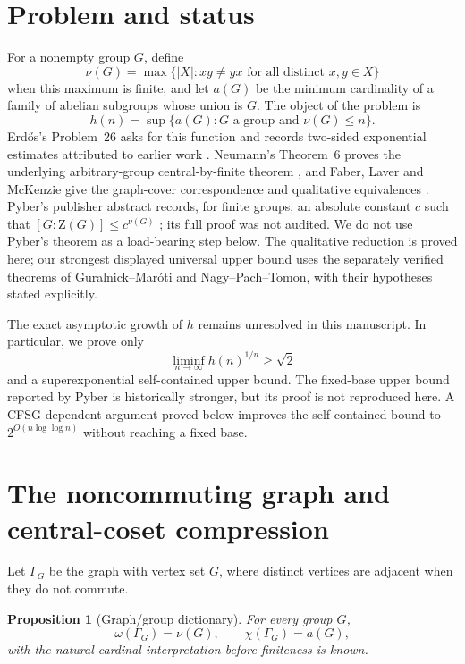 \documentclass[11pt]{article}
\newtheorem{proposition}[theorem]{Proposition}
\theoremstyle{remark}
\newcommand{\nuG}{\nu}
\newcommand{\aG}{a}
\newcommand{\Z}{\mathrm Z}
\begin{document}
\section{Problem and status}

For a nonempty group $G$, define
\[
 \nuG(G)=\max\{|X|:xy\ne yx\text{ for all distinct }x,y\in X\}
\]
when this maximum is finite, and let $\aG(G)$ be the minimum cardinality of
a family of abelian subgroups whose union is $G$.  The object of the problem
is
\[
 h(n)=\sup\{\aG(G):G\text{ a group and }\nuG(G)\le n\}.
\]
Erd\H{o}s's Problem~26 asks for this function and records two-sided
exponential estimates attributed to earlier work
\cite[p.~8]{erdos_1997}. Neumann's Theorem~6 proves the underlying
arbitrary-group central-by-finite theorem \cite[p.~470]{neumann_1976}, and
Faber, Laver and McKenzie give the graph-cover correspondence and qualitative
equivalences \cite[p.~933 and Theorem~3, pp.~936--937]
{faber_laver_mckenzie_1978}. Pyber's publisher abstract records, for finite
groups, an absolute constant $c$ such that
$[G:\Z(G)]\le c^{\nuG(G)}$ \cite{pyber_1987}; its full proof was not audited.
We do not use Pyber's theorem as a load-bearing step below.  The qualitative
reduction is proved here; our strongest displayed universal upper bound uses
the separately verified theorems of Guralnick--Mar\'oti and
Nagy--Pach--Tomon, with their hypotheses stated explicitly.

The exact asymptotic growth of $h$ remains unresolved in this manuscript.
In particular, we prove only
\[
 \liminf_{n\to\infty}h(n)^{1/n}\ge\sqrt2
\]
and a superexponential self-contained upper bound.  The fixed-base upper
bound reported by Pyber is historically stronger, but its proof is not
reproduced here.  A CFSG-dependent argument proved below improves the
self-contained bound to $2^{O(n\log\log n)}$ without reaching a fixed base.

\section{The noncommuting graph and central-coset compression}

Let $\Gamma_G$ be the graph with vertex set $G$, where distinct vertices are
adjacent when they do not commute.

\begin{proposition}[Graph/group dictionary]\label{prop:dictionary}
For every group $G$,
\[
 \omega(\Gamma_G)=\nuG(G),\qquad \chi(\Gamma_G)=\aG(G),
\]
with the natural cardinal interpretation before finiteness is known.
\end{proposition}
\end{document}
